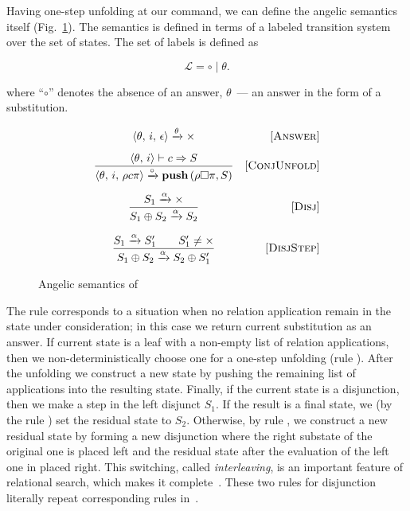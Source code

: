 Having one-step unfolding at our command, we can define the angelic semantics itself (Fig.~\ref{fair:angelic-semantics}). The semantics is defined in terms of a labeled transition
system over the set of states. The set of labels is defined as

\[
\mathcal{L} = \circ \mid \theta.
\]

where ``$\circ$'' denotes the absence of an answer, $\theta$~--- an answer in the form of a substitution.

\begin{figure}[h!]
\[\begin{array}{cr}
     {\langle \theta,\, i,\, \epsilon \rangle \xrightarrow{\theta} \times}  
&     \mbox{[\textsc{Answer}]} \\[3mm]
\dfrac{\langle \theta,\, i \rangle \vdash c \Rightarrow S}
      {\langle \theta,\, i,\, \rho c \pi \rangle \xrightarrow{\circ} \mbox{\bf push}\,(\rho \Box \pi, S)}
&     \mbox{[\textsc{ConjUnfold}]} \\[6mm]
\dfrac{S_1 \xrightarrow{\alpha} \times}
      {S_1 \oplus S_2 \xrightarrow{\alpha} S_2}
&     \mbox{[\textsc{Disj}]} \\[6mm]
\dfrac{S_1 \xrightarrow{\alpha} S^\prime_1 \qquad S^\prime_1 \not= \times}
      {S_1 \oplus S_2 \xrightarrow{\alpha} S_2 \oplus S^\prime_1}
&     \mbox{[\textsc{DisjStep}]}
\end{array}\]
\caption{Angelic semantics of \mk}
\label{fair:angelic-semantics}
\end{figure}

The rule  corresponds to a situation when no relation application remain in the state under consideration; in this case we return current substitution as an answer.
If current state is a leaf with a non-empty list of relation applications, then we non-deterministically choose one for a one-step unfolding (rule ). After the
unfolding we construct a new state by pushing the remaining list of applications into the resulting state. Finally, if the current state is a disjunction, then we make a step in
the left disjunct $S_1$. If the result is a final state, we (by the rule ) set the residual state to $S_2$. Otherwise, by rule , we construct a
new residual state by forming a new disjunction where the right substate of the original one is placed left and the residual state after the evaluation of the left one in
placed right. This switching, called \emph{interleaving}, is an important feature of relational search, which makes it complete~\cite{fair:interleaving}. These
two rules for disjunction literally repeat corresponding rules in~\cite{fair:semantics}.

